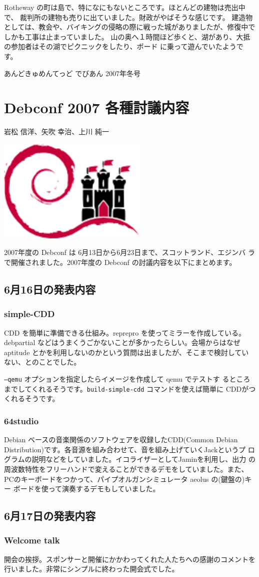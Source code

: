 \documentclass[mingoth,a4paper]{jsarticle}
\newcommand{\debconfsection}[2]{%
\newpage
あんどきゅめんてっど でびあん 2007年冬号
%
\vspace{0.1mm}\\
\colorbox{dancerlightblue}{\hspace{\hsize}}
%
%
\begin{minipage}[t]{0.7\hsize}
\color{dancerdarkblue}
\vspace{1cm}
\section{#1}
\hfill{}#2\\
\end{minipage}
\begin{minipage}[t]{0.3\hsize}
\vspace{-2cm}
\hfill{}\includegraphics[height=5cm]{image200706/logo-banner-split1.png}\\
\vspace{-5cm}
\end{minipage}
%
%
\colorbox{dancerdarkblue}{\hspace{\hsize}}
%
\vspace{2cm}
}
\begin{document}
Rotheway の町は島で、特になにもないところです。ほとんどの建物は売出中で、
裁判所の建物も売りに出ていました。財政がやばそうな感じです。
建造物としては、教会や、バイキングの侵略の際に戦った城がありましたが、修復中でしかも工事は止まっていました。
山の奥へ１時間ほど歩くと、湖があり、大抵の参加者はその湖でピクニックをしたり、ボード
に乗って遊んでいたようです。

\debconfsection{Debconf 2007 各種討議内容}{岩松 信洋、矢吹 幸治、上川 純一}
\label{sec:debconf2007detail}

2007年度の Debconf は 6月13日から6月23日まで、スコットランド、エジンバ
ラで開催されました。2007年度の Debconf の討議内容を以下にまとめます。

\subsection{6月16日の発表内容}
\subsubsection{simple-CDD}

CDD を簡単に準備できる仕組み。reprepro を使ってミラーを作成している。
debpartial などはうまくうごかないことが多かったらしい。会場からはなぜ
aptitude とかを利用しないのかという質問は出ましたが、そこまで検討してい
ない、とのことでした。

\texttt{--qemu} オプションを指定したらイメージを作成して qemu でテストす
るところまでしてくれるそうです。\texttt{build-simple-cdd} コマンドを使えば簡単に
CDDがつくれるそうです。

\subsubsection{64studio}
Debian ベースの音楽関係のソフトウェアを収録したCDD(Common Debian
Distribution)です。各音源を組み合わせて、音を組み上げていくJackというプ
ログラムの説明などをしていました。イコライザーとしてJaminを利用し、出力
の周波数特性をフリーハンドで変えることができるデモをしていました。また、
PCのキーボードをつかって、パイプオルガンシミュレータ aeolus の(鍵盤の)キー
ボードを使って演奏するデモもしていました。

\subsection{6月17日の発表内容}
\subsubsection{Welcome talk}
  開会の挨拶。スポンサーと開催にかかわってくれた人たちへの感謝のコメントを
  行いました。非常にシンプルに終わった開会式でした。
	
\end{document}
